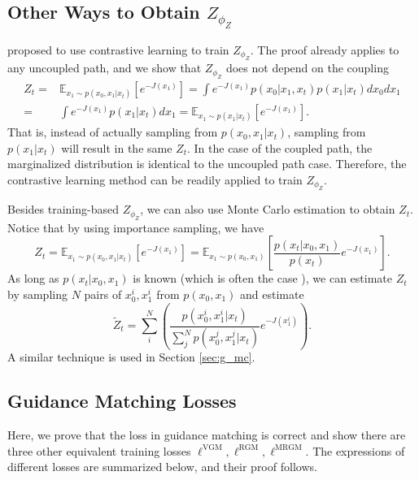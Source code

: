 \subsection{Other Ways to Obtain $Z_{\phi_Z}$}
\label{appendix:other_ways_to_learn_z}

\citet{lu_contrastive_nodate} proposed to use contrastive learning to train $Z_{\phi_Z}$. The proof already applies to any uncoupled path, and we show that $Z_{\phi_Z}$ does not depend on the coupling
\begin{align}
    Z_t =& \mathbb{E}_{x_1\sim p(x_0,x_1|x_t)}[e^{-J(x_1)}]= \int e^{-J(x_1)}p(x_0|x_1,x_t)p(x_1|x_t) dx_0 dx_1 \\
    =& \int e^{-J(x_1)}p(x_1|x_t) dx_1 = \mathbb{E}_{x_1\sim p(x_1|x_t)}[e^{-J(x_1)}].
\end{align}
That is, instead of actually sampling from $p(x_0,x_1|x_t)$, sampling from $p(x_1|x_t)$ will result in the same $Z_t$. In the case of the coupled path, the marginalized distribution is identical to the uncoupled path case. Therefore, the contrastive learning method can be readily applied to train $Z_{\phi_Z}$.

Besides training-based $Z_{\phi_Z}$, we can also use Monte Carlo estimation to obtain $Z_t$. Notice that by using importance sampling, we have
\begin{equation}
     Z_t = \mathbb{E}_{x_1\sim p(x_0,x_1|x_t)}[e^{-J(x_1)}] = \mathbb{E}_{x_1\sim p(x_0,x_1)}\left[\frac{p(x_t|x_0,x_1)}{p(x_t)}e^{-J(x_1)}\right].
\end{equation}
As long as $p(x_t|x_0,x_1)$ is known (which is often the case \citep{lipman_flow_2023,tong_improving_2024}), we can estimate $Z_t$ by sampling $N$ pairs of $x_0^i,x_1^i$ from $p(x_0,x_1)$ and estimate
\begin{equation}
    \tilde{Z}_t = \sum_i^N \left(\frac{p(x_0^i,x_1^i|x_t)}{\sum_j^N p(x_0^j,x_1^j|x_t)}e^{-J(x_1^i)}\right).
\end{equation}
A similar technique is used in Section \ref{sec:g_mc}.


\subsection{Guidance Matching Losses}
\label{app:guidance_matching}
Here, we prove that the loss in guidance matching is correct and show there are three other equivalent training losses $\ell^{\text{VGM}},\ell^{\text{RGM}},\ell^{\text{MRGM}}$.
The expressions of different losses are summarized below, and their proof follows.

